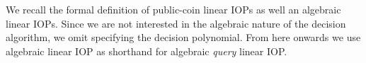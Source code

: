 

We recall the formal definition of public-coin linear IOPs as well an algebraic linear IOPs. Since we are not interested in the algebraic nature of the decision algorithm, we omit specifying the decision polynomial. From here onwards we use algebraic linear IOP as shorthand for algebraic \emph{query} linear IOP. %


